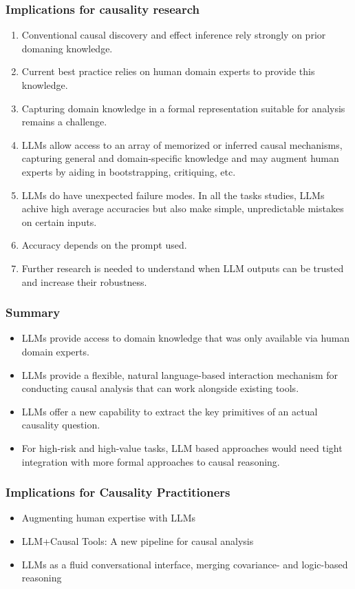 \documentclass{beamer}
\begin{document}
\begin{frame}
	\frametitle{Implications for causality research}
	\begin{enumerate}
		\item Conventional causal discovery and effect inference rely strongly on prior domaning knowledge.
		\item Current best practice relies on human domain experts to provide this knowledge.
		\item Capturing domain knowledge in a formal representation suitable for analysis remains a challenge.
		\item LLMs allow access to an array of memorized or inferred causal mechanisms, capturing general and domain-specific knowledge and may augment human experts by aiding in bootstrapping, critiquing, etc.
		\item LLMs do have unexpected failure modes. In all the tasks studies, LLMs achive high average accuracies but also make simple, unpredictable mistakes on certain inputs.
		\item Accuracy depends on the prompt used.
		\item Further research is needed to understand when LLM outputs can be trusted and increase their robustness.
	\end{enumerate}
\end{frame}

\begin{frame}
	\frametitle{Summary}
	\begin{itemize}
		\item LLMs provide access to domain knowledge that was only available
			via human domain experts.
		\item LLMs provide a flexible, natural language-based interaction 
			mechanism for conducting causal analysis that can work
			alongside existing tools.
		\item LLMs offer a new capability to extract the key primitives of
			an actual causality question.
		\item For high-risk and high-value tasks, LLM based approaches would
			need tight integration with more formal approaches to
			causal reasoning.
	\end{itemize}
\end{frame}

\begin{frame}
	\frametitle{Implications for Causality Practitioners}
	\begin{itemize}
		\item Augmenting human expertise with LLMs
		\item LLM+Causal Tools: A new pipeline for causal analysis
		\item LLMs as a fluid conversational interface, merging covariance-
			and logic-based reasoning
	\end{itemize}
\end{frame}
\end{document}
